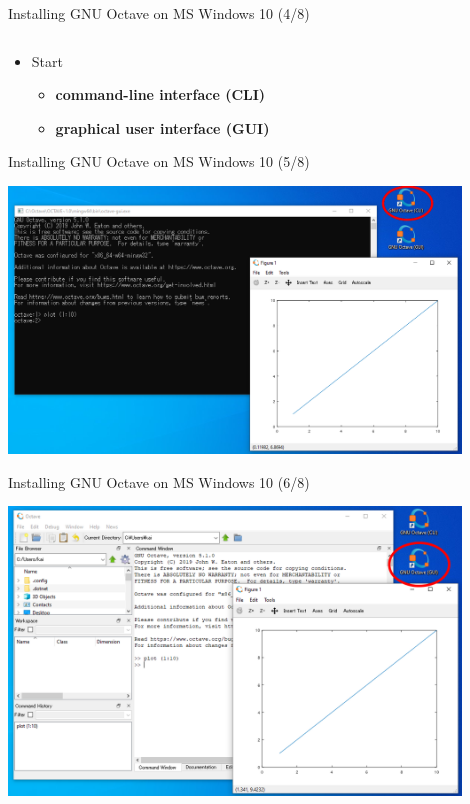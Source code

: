 \begin{frame}{Installing GNU Octave on MS Windows 10 (4/8)}
\begin{columns}
\begin{column}{0.4\textwidth}
\end{column}
\end{columns}
\begin{itemize}
\item
Start
\begin{itemize}
\item
\textbf{command-line interface (CLI)}
\item
\textbf{graphical user interface (GUI)}
\end{itemize}
\end{itemize}
\end{frame}



\begin{frame}{Installing GNU Octave on MS Windows 10 (5/8)}
\begin{center}
\includegraphics[width=0.9\textwidth]{res/ms_windows/win_octave_cli_plot.png}
\end{center}
\end{frame}



\begin{frame}{Installing GNU Octave on MS Windows 10 (6/8)}
\begin{center}
\includegraphics[width=0.9\textwidth]{res/ms_windows/win_octave_gui_plot.png}
\end{center}
\end{frame}



